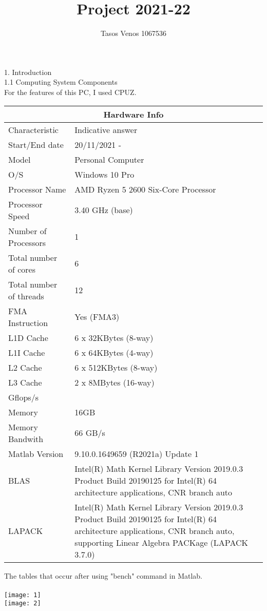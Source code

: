 \documentclass[10pt]{report}
\begin{document}
\title{Project 2021-22}
\author{Tasos Venos 1067536}
\maketitle
{\Huge 1. Introduction}
\\[0.5in]
{\Huge 1.1 Computing System Components}
\\[0.5in]
For the features of this PC, I used CPUZ.
\\[0.5in]
 
\begin{tabular}{ |p{6cm}||p{6cm}|}
 \hline
 \multicolumn{2}{|c|}{Hardware Info} \\
 \hline
 Characteristic & Indicative answer \\
 \hline
 Start/End date & 20/11/2021 - \\
 Model & Personal Computer \\
 O/S & Windows 10 Pro \\
 Processor Name & AMD Ryzen 5 2600 Six-Core Processor  \\
 Processor Speed & 3.40 GHz (base) \\
 Number of Processors & 1 \\
 Total number of cores & 6 \\
 Total number of threads & 12 \\
 FMA Instruction & Yes (FMA3) \\
 L1D Cache & 6 x 32KBytes (8-way) \\
 L1I Cache & 6 x 64KBytes (4-way) \\ 
 L2 Cache & 6 x 512KBytes (8-way) \\
 L3 Cache & 2 x 8MBytes (16-way) \\
 Gflops/s & \\
 Memory & 16GB \\
 Memory Bandwith & 66 GB/s \\
 Matlab Version & 9.10.0.1649659 (R2021a) Update 1 \\
 BLAS & Intel(R) Math Kernel Library Version 2019.0.3 Product Build 20190125 for Intel(R) 64 architecture applications, CNR branch auto \\
 LAPACK & Intel(R) Math Kernel Library Version 2019.0.3 Product Build 20190125 for Intel(R) 64 architecture applications, CNR branch auto, supporting Linear Algebra PACKage (LAPACK 3.7.0)\\
 \hline
\end{tabular}

\pagebreak
The tables that occur after using "bench" command in Matlab.
\\~\\
\texttt{[image: 1]}
\\[0.5in]
\texttt{[image: 2]}
\end{document}
